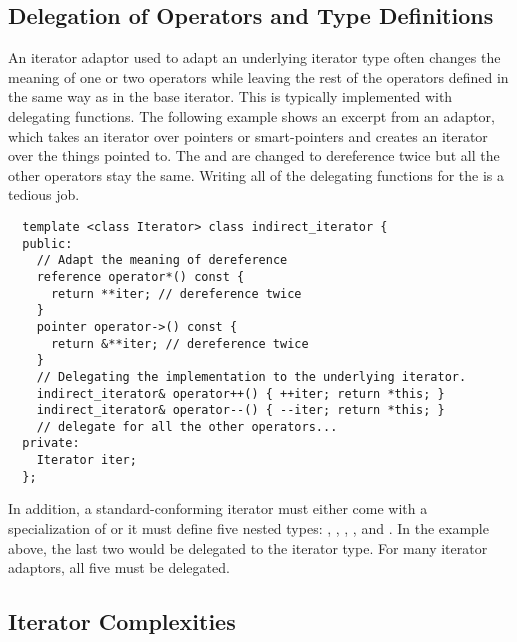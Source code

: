 \documentclass{netobjectdays}
\begin{document}
 


\subsection{Delegation of Operators and Type Definitions}

An iterator adaptor used to adapt an underlying iterator type often
changes the meaning of one or two operators while leaving the rest of
the operators defined in the same way as in the base iterator.  This
is typically implemented with delegating functions. The following
example shows an excerpt from an  adaptor,
which takes an iterator over pointers or smart-pointers and creates an
iterator over the things pointed to. The  and
 are changed to dereference twice but all the other
operators stay the same. Writing all of the delegating functions for
the  is a tedious job.

{\footnotesize
\begin{verbatim}
  template <class Iterator> class indirect_iterator {
  public:
    // Adapt the meaning of dereference
    reference operator*() const {
      return **iter; // dereference twice
    }
    pointer operator->() const {
      return &**iter; // dereference twice
    }
    // Delegating the implementation to the underlying iterator.
    indirect_iterator& operator++() { ++iter; return *this; }
    indirect_iterator& operator--() { --iter; return *this; }
    // delegate for all the other operators...
  private:
    Iterator iter;
  };
\end{verbatim}
}

In addition, a standard-conforming iterator must either come with a
specialization of  or it must define
five nested types: , ,
, , and
. In the example above, the last two would be
delegated to the  iterator type. For many iterator
adaptors, all five must be delegated.

\subsection{Iterator Complexities}
\end{document}
